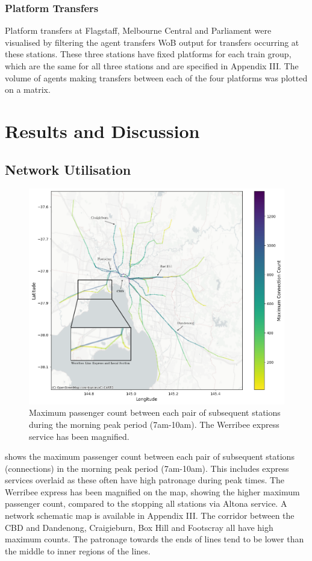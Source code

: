 \subsubsection{Platform Transfers}
Platform transfers at Flagstaff, Melbourne Central and Parliament were visualised by filtering the agent transfers WoB output for transfers occurring at these stations. These three stations have fixed platforms for each train group, which are the same for all three stations and are specified in Appendix III. The volume of agents making transfers between each of the four platforms was plotted on a matrix. 

\section{Results and Discussion}
\label{sec:resultsanddiscussion}
\subsection{Network Utilisation}
\begin{figure}[ht]
    \centering
    \includegraphics[width=\linewidth]{images/Case_Study/max_count_map_labelled.png}
    \caption[Maximum connection passenger count]{Maximum passenger count between each pair of subsequent stations during the morning peak period (7am-10am). The Werribee express service has been magnified.}
    \label{fig:max_connection_map}
\end{figure}
 shows the maximum passenger count between each pair of subsequent stations (connections) in the morning peak period (7am-10am). This includes express services overlaid as these often have high patronage during peak times. The Werribee express has been magnified on the map, showing the higher maximum passenger count, compared to the stopping all stations via Altona service. A network schematic map is available in Appendix III. The corridor between the CBD and Dandenong, Craigieburn, Box Hill and Footscray all have high maximum counts. The patronage towards the ends of lines tend to be lower than the middle to inner regions of the lines. 

